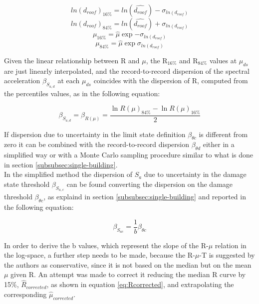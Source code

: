 \begin{equation}
ln(d_{roof})_{16\%} = ln(\hat{d_{roof}})-\sigma_{ln(d_{roof})}
\end{equation}
\begin{equation}
ln(d_{roof})_{84\%} = ln(\hat{d_{roof}})+\sigma_{ln(d_{roof})}
\end{equation}
\begin{equation}
\mu_{16\%} = \hat{\mu} \exp{-\sigma_{ln(d_{roof})}}
\end{equation}
\begin{equation}
\mu_{84\%} = \hat{\mu} \exp{\sigma_{ln(d_{roof})}}
\end{equation}

Given the linear relationship between R and $\mu$, the R$_{16\%}$ and R$_{84\%}$ values at $\mu_{ds}$ are just linearly interpolated, and the record-to-record dispersion of the spectral acceleration $\beta_{S_{a, d}}$ at each $\mu_{ds}$ coincides with the dispersion of R, computed from the percentiles values, as in the following equation:

\begin{equation}
\label{eq:beta_DF}
\beta_{S_{a, d}} = \beta_{R(\mu)} = \frac{\ln R(\mu)_{84\%} - \ln R(\mu)_{16\%}}{2}
\end{equation} 

If dispersion due to uncertainty in the limit state definition $\beta_{\theta c}$ is different from zero it can be combined with the record-to-record dispersion $\beta_{\theta d}$ either in a simplified way or with a Monte Carlo sampling procedure similar to what is done in section \ref{subsubsec:single-building}.\\

In the simplified method the dispersion of $S_a$ due to uncertainty in the damage state threshold $\beta_{S_{a, c}}$  can be found converting the dispersion on the damage threshold $\beta_{\theta c}$, as explaind in section \ref{subsubsec:single-building} and reported in the following equation:

\begin{equation}
\beta_{S_{a c}} = \frac{1}{b} \beta_{\theta c}
\label{eq:betasc_DF}
\end{equation}

In order to derive the b values, which represent the slope of the R-$\mu$ relation in the log-space, a further step needs to be made, because the R-$\mu$-T is suggested by the authors as conservative, since it is not based on the median but on the mean $\mu$ given R. An attempt was made to correct it reducing the median R curve by 15\%, $\hat{R}_{corrected}$, as shown in equation \ref{eq:Rcorrected}, and extrapolating the corresponding $\hat{\mu}_{corrected}$.

